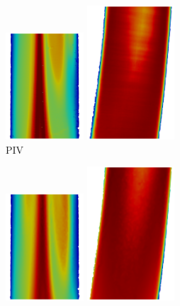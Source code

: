 \begin{figure}\centering
\begin{minipage}[c][10cm][c]{0.25\textwidth}
\centering
\vspace*{\fill}
\includegraphics[height=4cm]{imgs/vena_cava/PIV_coronal_exercise.png}
\includegraphics[height=5cm]{imgs/vena_cava/PIV_sagittal_exercise.png}
\\PIV
\end{minipage}
\begin{minipage}[c][10cm][c]{0.25\textwidth}
\centering
\vspace*{\fill}
\includegraphics[height=4cm]{imgs/vena_cava/FEM_coronal_exercise.png}
\includegraphics[height=5cm]{imgs/vena_cava/FEM_sagittal_exercise.png}

\end{minipage}
\end{figure}
